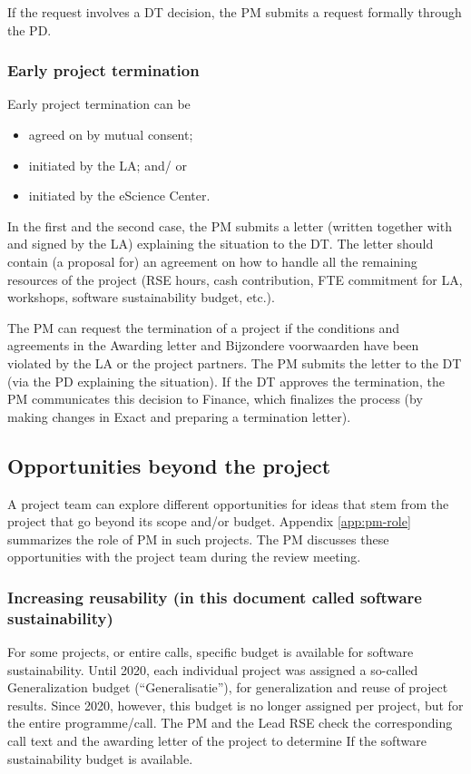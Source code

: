 If the request involves a DT decision, the PM submits a request formally through the PD.

\subsubsection{Early project termination}
Early project termination can be
\begin{itemize}
\item agreed on by mutual consent;
\item initiated by the LA; and/ or
\item initiated by the eScience Center.
\end{itemize}

In the first and the second case, the PM submits a letter (written together with and signed by the LA) explaining the
situation to the DT. The letter should contain (a proposal for) an agreement on how to handle all the remaining
resources of the project (RSE hours, cash contribution, FTE commitment for LA, workshops, software sustainability
budget, etc.). 

The PM can request the termination of a project if the conditions and agreements in the Awarding letter and Bijzondere
voorwaarden have been violated by the LA or the project partners. The PM submits the letter to the DT (via the PD
explaining the situation). If the DT approves the termination, the PM communicates this decision to Finance, which
finalizes the process (by making changes in Exact and preparing a termination letter).

\subsection{Opportunities beyond the project}
\label{sec:opportunities}
A project team can explore different opportunities for ideas that stem from the project that go beyond its scope and/or
budget. Appendix \ref{app:pm-role} summarizes the role of PM in such projects. The PM discusses these opportunities with the project
team during the review meeting.


\subsubsection{Increasing reusability (in this document called software sustainability)}
\label{sec:opportunities:ss}
For some projects, or entire calls, specific budget is available for software sustainability. Until 2020, each
individual project was assigned a so-called Generalization budget (“Generalisatie”), for generalization and reuse of
project results. Since 2020, however, this budget is no longer assigned per project, but for the entire programme/call.
The PM and the Lead RSE check the corresponding call text and the awarding letter of the project to determine If the
software sustainability budget is available.

